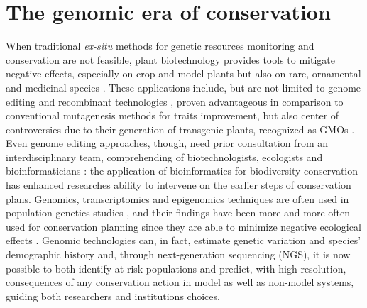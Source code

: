 \documentclass[a4paper, 12pt]{report}
\begin{document}
\section{The genomic era of conservation}
When traditional \textit{ex-situ} methods for genetic resources monitoring and conservation are not feasible, plant biotechnology provides tools to mitigate negative effects, especially on crop and model plants \parencite{yinPlantConservationAge2024} but also on rare, ornamental and medicinal species \parencite{salgotraGeneticDiversityConservation2023}. These applications include, but are not limited to genome editing \parencite{suppleConservationBiodiversityGenomics2018} and recombinant technologies \parencite{salgotraGeneticDiversityConservation2023}, proven advantageous in comparison to conventional mutagenesis methods for traits improvement, but also center of controversies due to their generation of transgenic plants, recognized as GMOs \parencite{yinPlantConservationAge2024}. Even genome editing approaches, though, need prior consultation from an interdisciplinary team, comprehending of biotechnologists, ecologists and bioinformaticians \parencite{yinPlantConservationAge2024}: the application of bioinformatics for biodiversity conservation has enhanced researches ability to intervene on the earlier steps of conservation plans. Genomics, transcriptomics and epigenomics techniques are often used in population genetics studies \parencite{yinPlantConservationAge2024}, and their findings have been more and more often used for conservation planning \parencite{habelBurdenGeneticDiversity2012} since they are able to minimize negative ecological effects \parencite{yinPlantConservationAge2024}. Genomic technologies can, in fact, estimate genetic variation \parencite{whitlockConsequencesInsituStrategies2016} and species' demographic history \parencite{yinPlantConservationAge2024} and, through next-generation sequencing (NGS), it is now possible to both identify at risk-populations and predict, with high resolution, consequences of any conservation action \parencite{suppleConservationBiodiversityGenomics2018} in model as well as non-model systems, guiding both researchers and institutions choices.
\end{document}
